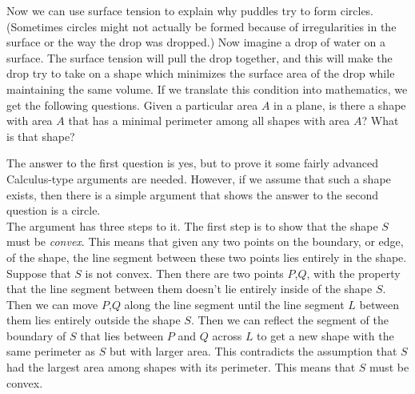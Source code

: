 Now we can use surface tension to explain why puddles try to form circles. (Sometimes circles might not actually be formed because of irregularities in the surface or the way the drop was dropped.) Now imagine a drop of water on a surface. The surface tension will pull the drop together, and this will make the drop try to take on a shape which minimizes the surface area of the drop while maintaining the same volume. If we translate this condition into mathematics, we get the following questions. Given a particular area $A$ in a plane, is there a shape with area $A$ that has a minimal perimeter among all shapes with area $A$? What is that shape? \\

 \vspace{0.2cm}

The answer to the first question is yes, but to prove it some fairly advanced Calculus-type arguments are needed. However, if we assume that such a shape exists, then there is a simple argument that shows the answer to the second question is a circle. \\

The argument has three steps to it. The first step is to show that the shape $S$ must be \emph{convex}. This means that given any two points on the boundary, or edge, of the shape, the line segment between these two points lies entirely in the shape. Suppose that $S$ is not convex. Then there are two points $P$,$Q$, with the property that the line segment between them doesn't lie entirely inside of the shape $S$. Then we can move $P$,$Q$ along the line segment until the line segment $L$ between them lies entirely outside the shape $S$. Then we can reflect the segment of the boundary of $S$ that lies between $P$ and $Q$ across $L$ to get a new shape with the same perimeter as $S$ but with larger area. This contradicts the assumption that $S$ had the largest area among shapes with its perimeter. This means that $S$ must be convex. \\

